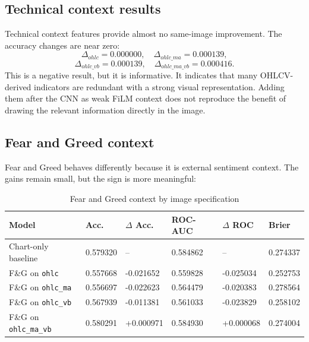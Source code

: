 \documentclass[14pt,a4paper]{extarticle}
\newcommand{\code}[1]{\texttt{#1}}
\begin{document}
\subsection{Technical context results}

Technical context features provide almost no same-image improvement. The accuracy changes are near zero:
\begin{equation*}
\Delta_{ohlc}=0.000000,\quad \Delta_{ohlc\_ma}=0.000139,
\end{equation*}
\begin{equation*}
\Delta_{ohlc\_vb}=0.000139,\quad \Delta_{ohlc\_ma\_vb}=0.000416.
\end{equation*}
This is a negative result, but it is informative. It indicates that many OHLCV-derived indicators are redundant with a strong visual representation. Adding them after the CNN as weak FiLM context does not reproduce the benefit of drawing the relevant information directly in the image.

\subsection{Fear and Greed context}

Fear and Greed behaves differently because it is external sentiment context. The gains remain small, but the sign is more meaningful:
\begin{table}[H]
\caption{Fear and Greed context by image specification}
\begin{center}
\small
\setlength{\tabcolsep}{3pt}
\begin{tabular}{p{}p{}p{}p{}p{}p{}}
\toprule
\textbf{Model} & \textbf{Acc.} & \textbf{$\Delta$ Acc.} & \textbf{ROC-AUC} & \textbf{$\Delta$ ROC} & \textbf{Brier}\\
\midrule
Chart-only baseline & 0.579320 & -- & 0.584862 & -- & 0.274337\\
F\&G on \code{ohlc} & 0.557668 & -0.021652 & 0.559828 & -0.025034 & 0.252753\\
F\&G on \code{ohlc\_ma} & 0.556697 & -0.022623 & 0.564479 & -0.020383 & 0.278564\\
F\&G on \code{ohlc\_vb} & 0.567939 & -0.011381 & 0.561033 & -0.023829 & 0.258102\\
F\&G on \code{ohlc\_ma\_vb} & 0.580291 & +0.000971 & 0.584930 & +0.000068 & 0.274004\\
\bottomrule
\end{tabular}
\end{center}
\end{table}
\end{document}
